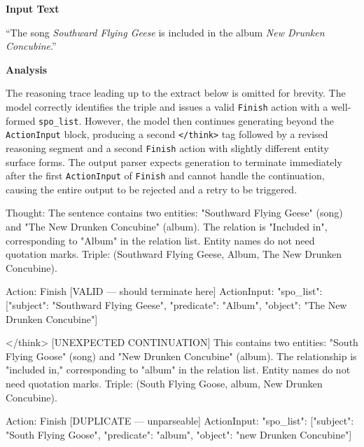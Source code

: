\begin{appendices}
\begin{tcolorbox}[errorbox, title=Example 3 — Parsing Error
(AgentRE\textsubscript{orig} Test Set Sample 20 Attempt 3)]
\textbf{Input Text}

\smallskip\small
``The song \textit{Southward Flying Geese} is included in the album
\textit{New Drunken Concubine}.''

\medskip
\textbf{Analysis}

\smallskip\small
The reasoning trace leading up to the extract below is omitted for
brevity. The model correctly identifies the triple and issues a valid
\texttt{Finish} action with a well-formed \texttt{spo\_list}. However,
the model then continues generating beyond the \texttt{ActionInput}
block, producing a second \texttt{</think>} tag followed by a revised
reasoning segment and a second \texttt{Finish} action with slightly
different entity surface forms. The output parser expects generation
to terminate immediately after the first \texttt{ActionInput} of
\texttt{Finish} and cannot handle the continuation, causing the entire
output to be rejected and a retry to be triggered.

\end{tcolorbox}

\begin{tcolorbox}[tracebox, title=Model Reasoning Trace (from Finish action onward)]
  Thought: The sentence contains two entities: "Southward Flying Geese"
           (song) and "The New Drunken Concubine" (album). The relation
           is "Included in", corresponding to "Album" in the relation
           list. Entity names do not need quotation marks.
           Triple: (Southward Flying Geese, Album, The New Drunken Concubine).

  Action:      Finish                               [VALID — should terminate here]
  ActionInput: {"spo\_list": [{"subject": "Southward Flying Geese",
                               "predicate": "Album",
                               "object": "The New Drunken Concubine"}]}

  </think>                                          [UNEXPECTED CONTINUATION]
  This contains two entities: "South Flying Goose" (song) and
  "New Drunken Concubine" (album). The relationship is "included in,"
  corresponding to "album" in the relation list. Entity names do not
  need quotation marks.
  Triple: (South Flying Goose, album, New Drunken Concubine).

  Action:      Finish                               [DUPLICATE — unparseable]
  ActionInput: {"spo\_list": [{"subject": "South Flying Goose",
                               "predicate": "album",
                               "object": "new Drunken Concubine"}]}


\end{tcolorbox}
\end{appendices}
